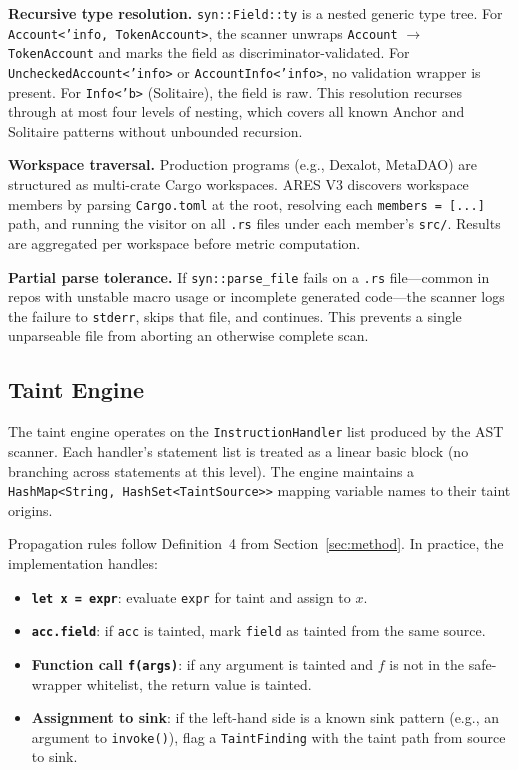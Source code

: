 \documentclass{article}
\begin{document}
\textbf{Recursive type resolution.} \texttt{syn::Field::ty} is a nested generic type tree. For \texttt{Account<'info, TokenAccount>}, the scanner unwraps \texttt{Account} $\to$ \texttt{TokenAccount} and marks the field as discriminator-validated. For \texttt{UncheckedAccount<'info>} or \texttt{AccountInfo<'info>}, no validation wrapper is present. For \texttt{Info<'b>} (Solitaire), the field is raw. This resolution recurses through at most four levels of nesting, which covers all known Anchor and Solitaire patterns without unbounded recursion.

\textbf{Workspace traversal.} Production programs (e.g., Dexalot, MetaDAO) are structured as multi-crate Cargo workspaces. ARES V3 discovers workspace members by parsing \texttt{Cargo.toml} at the root, resolving each \texttt{members = [...]} path, and running the visitor on all \texttt{.rs} files under each member's \texttt{src/}. Results are aggregated per workspace before metric computation.

\textbf{Partial parse tolerance.} If \texttt{syn::parse\_file} fails on a \texttt{.rs} file---common in repos with unstable macro usage or incomplete generated code---the scanner logs the failure to \texttt{stderr}, skips that file, and continues. This prevents a single unparseable file from aborting an otherwise complete scan.

\subsection{Taint Engine}

The taint engine operates on the \texttt{InstructionHandler} list produced by the AST scanner. Each handler's statement list is treated as a linear basic block (no branching across statements at this level). The engine maintains a \texttt{HashMap<String, HashSet<TaintSource>>} mapping variable names to their taint origins.

Propagation rules follow Definition~4 from Section~\ref{sec:method}. In practice, the implementation handles:
\begin{itemize}
  \item \textbf{\texttt{let x = expr}}: evaluate \texttt{expr} for taint and assign to $x$.
  \item \textbf{\texttt{acc.field}}: if \texttt{acc} is tainted, mark \texttt{field} as tainted from the same source.
  \item \textbf{Function call \texttt{f(args)}}: if any argument is tainted and $f$ is not in the safe-wrapper whitelist, the return value is tainted.
  \item \textbf{Assignment to sink}: if the left-hand side is a known sink pattern (e.g., an argument to \texttt{invoke()}), flag a \texttt{TaintFinding} with the taint path from source to sink.
\end{itemize}
\end{document}
